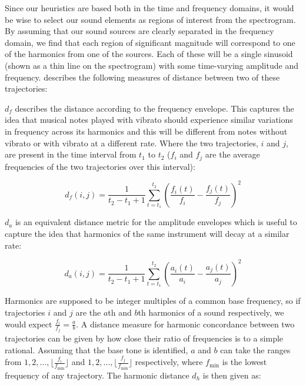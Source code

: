 \documentclass[10pt,twoside,a4paper]{report}
\begin{document}
Since our heuristics are based both in the time and frequency domains, it would be wise to select our sound elements as regions of interest from the spectrogram. By assuming that our sound sources are clearly separated in the frequency domain, we find that each region of significant magnitude will correspond to one of the harmonics from one of the sources. Each of these will be a single sinusoid (shown as a thin line on the spectrogram) with some time-varying amplitude and frequency. \cite{virtanen2000separation} describes the following measures of distance between two of these trajectories:

$ d_f $ describes the distance according to the frequency envelope. This captures the idea that musical notes played with vibrato should experience similar variations in frequency across its harmonics and this will be different from notes without vibrato or with vibrato at a different rate. Where the two trajectories, $ i $ and $ j $, are present in the time interval from $ t_1 $ to $ t_2 $ ($ f_i $ and $ f_j $ are the average frequencies of the two trajectories over this interval):

\begin{equation}
d_f(i,j) = \frac{1}{t_2 - t_1 + 1} \sum_{t = t_1}^{t_2} \left( \frac{f_i(t)}{f_i} - \frac{f_j(t)}{f_j} \right)^2
\end{equation}

$ d_a $ is an equivalent distance metric for the amplitude envelopes which is useful to capture the idea that harmonics of the same instrument will decay at a similar rate:

\begin{equation}
d_a(i,j) = \frac{1}{t_2 - t_1 + 1} \sum_{t = t_1}^{t_2} \left( \frac{a_i(t)}{a_i} - \frac{a_j(t)}{a_j} \right)^2
\end{equation}

Harmonics are supposed to be integer multiples of a common base frequency, so if trajectories $ i $ and $ j $ are the $ a $th and $ b $th harmonics of a sound respectively, we would expect $ \frac{f_i}{f_j} = \frac{a}{b} $. A distance measure for harmonic concordance between two trajectories can be given by how close their ratio of frequencies is to a simple rational. Assuming that the base tone is identified, $ a $ and $ b $ can take the ranges from $ 1, 2, \ldots, \lfloor \frac{f_i}{f_{\mathrm{min}}} \rfloor $ and $ 1, 2, \ldots, \lfloor \frac{f_j}{f_{\mathrm{min}}} \rfloor $ respectively, where $ f_{\mathrm{min}} $ is the lowest frequency of any trajectory. The harmonic distance $ d_h $ is then given as:
\end{document}
